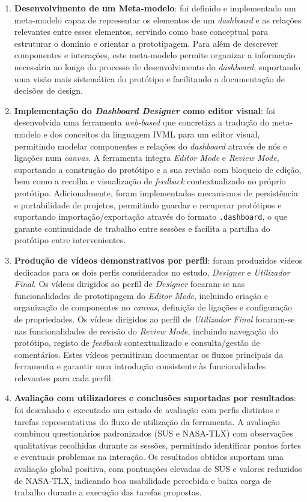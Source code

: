 \begin{enumerate}
    \item \textbf{Desenvolvimento de um Meta-modelo}: foi definido e implementado um meta-modelo capaz de representar os elementos de um \textit{dashboard} e as relações relevantes entre esses elementos, servindo como base conceptual para estruturar o domínio e orientar a prototipagem. Para além de descrever componentes e interações, este meta-modelo permite organizar a informação necessária ao longo do processo de desenvolvimento do \textit{dashboard}, suportando uma visão mais sistemática do protótipo e facilitando a documentação de decisões de design. 
 
    \item \textbf{Implementação do \textit{Dashboard Designer} como editor visual}: foi desenvolvida uma ferramenta \textit{web-based} que concretiza a tradução do meta-modelo e dos conceitos da linguagem \gls{IVML} para um editor visual, permitindo modelar componentes e relações do \textit{dashboard} através de nós e ligações num \textit{canvas}. A ferramenta integra \textit{Editor Mode} e \textit{Review Mode}, suportando a construção do protótipo e a sua revisão com bloqueio de edição, bem como a recolha e visualização de \textit{feedback} contextualizado no próprio protótipo. Adicionalmente, foram implementados mecanismos de persistência e portabilidade de projetos, permitindo guardar e recuperar protótipos e suportando importação/exportação através do formato \texttt{.dashboard}, o que garante continuidade de trabalho entre sessões e facilita a partilha do protótipo entre intervenientes.

    \item \textbf{Produção de vídeos demonstrativos por perfil}: foram produzidos vídeos dedicados para os dois perfis considerados no estudo, \textit{Designer} e \textit{Utilizador Final}. Os vídeos dirigidos ao perfil de \textit{Designer} focaram-se nas funcionalidades de prototipagem do \textit{Editor Mode}, incluindo criação e organização de componentes no \textit{canvas}, definição de ligações e configuração de propriedades. Os vídeos dirigidos ao perfil de \textit{Utilizador Final} focaram-se nas funcionalidades de revisão do \textit{Review Mode}, incluindo navegação do protótipo, registo de \textit{feedback} contextualizado e consulta/gestão de comentários. Estes vídeos permitiram documentar os fluxos principais da ferramenta e garantir uma introdução consistente às funcionalidades relevantes para cada perfil.

    \item \textbf{Avaliação com utilizadores e conclusões suportadas por resultados}: foi desenhado e executado um estudo de avaliação com perfis distintos e tarefas representativas do fluxo de utilização da ferramenta. A avaliação combinou questionários padronizados (SUS e NASA-TLX) com observações qualitativas recolhidas durante as sessões, permitindo identificar pontos fortes e eventuais problemas na interação. Os resultados obtidos suportam uma avaliação global positiva, com pontuações elevadas de SUS e valores reduzidos de NASA-TLX, indicando boa usabilidade percebida e baixa carga de trabalho durante a execução das tarefas propostas.
\end{enumerate}

